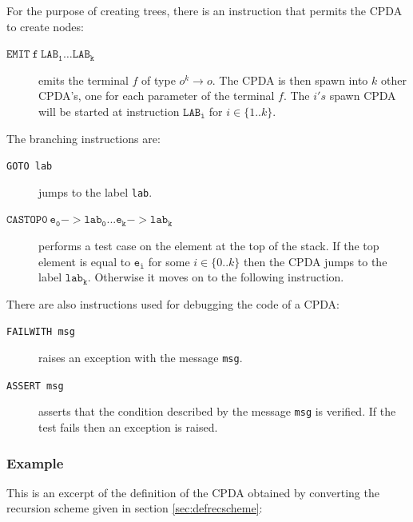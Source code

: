 \documentclass{article}
\begin{document}
For the purpose of creating trees, there is an instruction that permits the CPDA to 
create nodes:
\begin{description}
  \item[$\mathtt{EMIT\ f\ LAB_1 \ldots LAB_k}$] emits the terminal $f$ of type $o^k \rightarrow o$.
   The CPDA is then spawn into $k$ other CPDA's, one for each parameter of the terminal $f$.
   The $i's$ spawn CPDA will be started at instruction $\mathtt{LAB_i}$ for $i \in \{1..k\}$.
\end{description}

The branching instructions are:
\begin{description}
  \item[{\tt GOTO lab}] jumps to the label {\tt lab}.
  \item[$\mathtt{CASTOP0\ e_0->lab_0 ... e_k->lab_k}$] performs a test case on the element
  at the top of the stack. If the top element is equal to $\mathtt{e_i}$ for some $i \in \{0..k\}$
  then the CPDA jumps to the label $\mathtt{lab_k}$. Otherwise it moves on to the following instruction.
\end{description}

There are also instructions used for debugging the code of a CPDA:
\begin{description}
  \item[{\tt FAILWITH msg}] raises an exception with the message {\tt msg}.
  \item[{\tt ASSERT msg}] asserts that the condition described by the message {\tt msg} is verified. If the test fails then an exception is raised.
\end{description}

\subsubsection{Example}

This is an excerpt of the definition of the CPDA obtained by converting the recursion scheme given in section \ref{sec:defrecscheme}:
\end{document}
